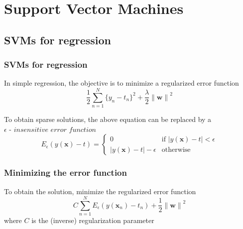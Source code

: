 \documentclass[t,14pt]{beamer}
\date[Introduction]{Support Vector Machines}
\begin{document}
\begin{frame}
  \titlepage
\end{frame}

\section{Support Vector Machines}

\subsection{SVMs for regression}

\begin{frame}
  \frametitle{SVMs for regression}
  In simple regression, the objective is to minimize a regularized error 
  function
  \begin{equation}
    \frac{\displaystyle 1}{\displaystyle 2}
        \sum\limits_{n=1}^N \{y_n - t_n\}^2 + 
        \frac{\displaystyle \lambda}{\displaystyle 2}{\lVert \mathbf{w} \rVert}^2
  \end{equation}

  To obtain sparse solutions, the above equation can be replaced by a 
  $\epsilon \textit{ - insensitive error function}$
  \begin{equation}
    E_\epsilon(y(\mathbf{x}) - t) = 
        \begin{cases}
            0 & \text{if } \lvert y(\mathbf{x}) - t \rvert < \epsilon \\
            \lvert y(\mathbf{x}) - t \rvert - \epsilon & \text{otherwise}
        \end{cases}
  \end{equation}
\end{frame}

\begin{frame}
  \frametitle{Minimizing the error function}
  To obtain the solution, minimize the regularized error function
  \begin{equation}
    C \sum\limits_{n=1}^N E_\epsilon(y(\mathbf{x}_n) - t_n) + 
      \frac{\displaystyle 1}{\displaystyle 2}{\lVert \mathbf{w} \rVert}^2
  \end{equation} 
  where $C$ is the (inverse) regularization parameter
\end{frame}
\end{document}
